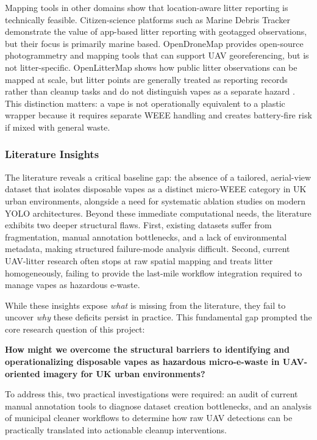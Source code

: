 Mapping tools in other domains show that location-aware litter reporting is technically feasible. Citizen-science platforms such as Marine Debris Tracker demonstrate the value of app-based litter reporting with geotagged observations, but their focus is primarily marine based. OpenDroneMap provides open-source photogrammetry and mapping tools that can support UAV georeferencing, but is not litter-specific. OpenLitterMap shows how public litter observations can be mapped at scale, but litter points are generally treated as reporting records rather than cleanup tasks and do not distinguish vapes as a separate hazard \cite{marine_debris_tracker,opendronemap_docs,openlittermap}. This distinction matters: a vape is not operationally equivalent to a plastic wrapper because it requires separate WEEE handling and creates battery-fire risk if mixed with general waste.

\subsubsection{Literature Insights}
The literature reveals a critical baseline gap: the absence of a tailored, aerial-view dataset that isolates disposable vapes as a distinct micro-WEEE category in UK urban environments, alongside a need for systematic ablation studies on modern YOLO architectures. Beyond these immediate computational needs, the literature exhibits two deeper structural flaws. First, existing datasets suffer from fragmentation, manual annotation bottlenecks, and a lack of environmental metadata, making structured failure-mode analysis difficult. Second, current UAV-litter research often stops at raw spatial mapping and treats litter homogeneously, failing to provide the last-mile workflow integration required to manage vapes as hazardous e-waste.

While these insights expose \textit{what} is missing from the literature, they fail to uncover \textit{why} these deficits persist in practice. This fundamental gap prompted the core research question of this project:

\vspace{0.5em}
\noindent\textbf{How might we overcome the structural barriers to identifying and operationalizing disposable vapes as hazardous micro-e-waste in UAV-oriented imagery for UK urban environments?}

To address this, two practical investigations were required: an audit of current manual annotation tools to diagnose dataset creation bottlenecks, and an analysis of municipal cleaner workflows to determine how raw UAV detections can be practically translated into actionable cleanup interventions.
